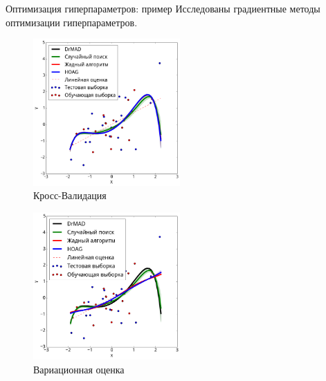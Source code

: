 \documentclass[usenames,dvipsnames,11pt,pdf,utf8,russian,aspectratio=43]{beamer}
\begin{document}
\begin{frame}{Оптимизация гиперпараметров: пример}
Исследованы градиентные методы оптимизации гиперпараметров. \\

\begin{multicols}{2}

\begin{figure}[h]
\hspace*{-1cm}
\includegraphics[width=0.5\textwidth]{./slide_plots/poly_cv.png}
\caption*{Кросс-Валидация}
\end{figure}

\begin{figure}[h]
\hspace*{-1cm}
\includegraphics[width=0.5\textwidth]{./slide_plots/poly_var.png}
\caption*{Вариационная оценка}
\end{figure}
\end{multicols}

\end{frame}
\end{document}
